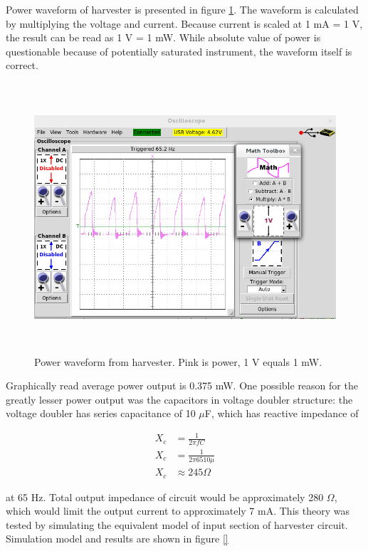 Power waveform of harvester is presented in figure \ref{fig:inductive_power_65}. The waveform is calculated by multiplying the voltage and current. Because current is scaled at 1 mA = 1 V, the result can be read as 1 V = 1 mW. While absolute value of power is questionable because of potentially saturated instrument, the waveform itself is correct.  

\begin{figure}[htb]
\begin{center}
\includegraphics[height=10cm]{images/own_measurement/generator_shaker/inductive_td_harvesting_power_65Hz_ferro.png}
\end{center}
\caption{\label{fig:inductive_power_65} Power waveform from harvester. Pink is power, 1 V equals 1 mW.}
\end{figure}

Graphically read average power output is 0.375 mW. One possible reason for the greatly lesser power output was the capacitors in voltage doubler structure: the voltage doubler has series capacitance of 10 $\mu$F, which has reactive impedance of

\begin{equation}
\begin{split}
  X_c& = \frac{1}{2 \pi f C} \\
  X_c& = \frac{1}{2 \pi 65 10\mu} \\
  X_c& \approx 245 \Omega
\end{split}
\end{equation}

at 65 Hz. Total output impedance of circuit would be approximately 280 $\Omega$, which would limit the output current to approximately 7 mA. This theory was tested by simulating the equivalent model of input section of harvester circuit. Simulation model and results are shown in figure \ref{}

